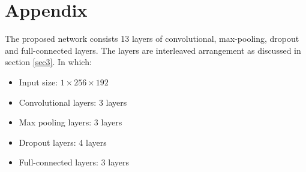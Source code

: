 \documentclass[conference]{IEEEtran}
\begin{document}



\section*{Appendix}
The proposed network consists 13 layers of convolutional, max-pooling, dropout and full-connected layers. The layers are interleaved arrangement as discussed in section \ref{sec3}. In which:
\begin{itemize}
	\item Input size: $1 \times 256 \times 192$
	\item Convolutional layers: 3 layers
	\item Max pooling layers: 3 layers
	\item Dropout layers: 4 layers
	\item Full-connected layers: 3 layers
\end{itemize}
\end{document}
